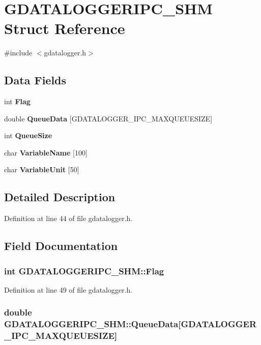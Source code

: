 \section{GDATALOGGERIPC\_\-SHM Struct Reference}
\label{structGDATALOGGERIPC__SHM}


{\ttfamily \#include $<$gdatalogger.h$>$}\subsection*{Data Fields}
\begin{DoxyCompactItemize}
\item 
int {\bf Flag}
\item 
double {\bf QueueData} [GDATALOGGER\_\-IPC\_\-MAXQUEUESIZE]
\item 
int {\bf QueueSize}
\item 
char {\bf VariableName} [100]
\item 
char {\bf VariableUnit} [50]
\end{DoxyCompactItemize}


\subsection{Detailed Description}


Definition at line 44 of file gdatalogger.h.

\subsection{Field Documentation}
\subsubsection[{Flag}]{\setlength{\rightskip}{0pt plus 5cm}int {\bf GDATALOGGERIPC\_\-SHM::Flag}}\label{structGDATALOGGERIPC__SHM_a346eca077a97246740a6ed4f7c08833c}


Definition at line 49 of file gdatalogger.h.
\subsubsection[{QueueData}]{\setlength{\rightskip}{0pt plus 5cm}double {\bf GDATALOGGERIPC\_\-SHM::QueueData}[GDATALOGGER\_\-IPC\_\-MAXQUEUESIZE]}\label{structGDATALOGGERIPC__SHM_ac495752de142e6697c08f713505ed55c}


